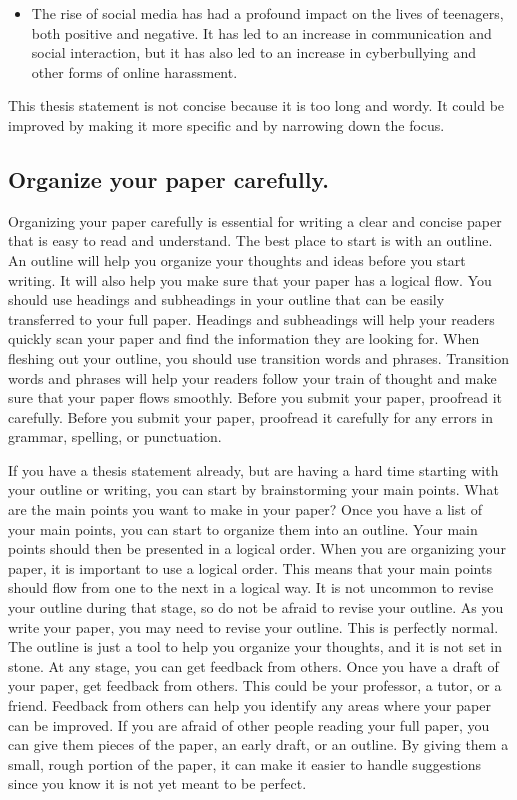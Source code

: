 \documentclass[
  b5paper]{book}
\providecommand{\tightlist}{%
  \setlength{\itemsep}{0pt}\setlength{\parskip}{0pt}}
\begin{document}
\begin{itemize}
\tightlist
\item
  The rise of social media has had a profound impact on the lives of teenagers, both positive and negative. It has led to an increase in communication and social interaction, but it has also led to an increase in cyberbullying and other forms of online harassment.
\end{itemize}

This thesis statement is not concise because it is too long and wordy. It could be improved by making it more specific and by narrowing down the focus.

\hypertarget{organize-your-paper-carefully.}{%
\subsection*{Organize your paper carefully.}\label{organize-your-paper-carefully.}}

Organizing your paper carefully is essential for writing a clear and concise paper that is easy to read and understand. The best place to start is with an outline. An outline will help you organize your thoughts and ideas before you start writing. It will also help you make sure that your paper has a logical flow. You should use headings and subheadings in your outline that can be easily transferred to your full paper. Headings and subheadings will help your readers quickly scan your paper and find the information they are looking for. When fleshing out your outline, you should use transition words and phrases. Transition words and phrases will help your readers follow your train of thought and make sure that your paper flows smoothly. Before you submit your paper, proofread it carefully. Before you submit your paper, proofread it carefully for any errors in grammar, spelling, or punctuation.

If you have a thesis statement already, but are having a hard time starting with your outline or writing, you can start by brainstorming your main points. What are the main points you want to make in your paper? Once you have a list of your main points, you can start to organize them into an outline. Your main points should then be presented in a logical order. When you are organizing your paper, it is important to use a logical order. This means that your main points should flow from one to the next in a logical way. It is not uncommon to revise your outline during that stage, so do not be afraid to revise your outline. As you write your paper, you may need to revise your outline. This is perfectly normal. The outline is just a tool to help you organize your thoughts, and it is not set in stone. At any stage, you can get feedback from others. Once you have a draft of your paper, get feedback from others. This could be your professor, a tutor, or a friend. Feedback from others can help you identify any areas where your paper can be improved. If you are afraid of other people reading your full paper, you can give them pieces of the paper, an early draft, or an outline. By giving them a small, rough portion of the paper, it can make it easier to handle suggestions since you know it is not yet meant to be perfect.
\end{document}
